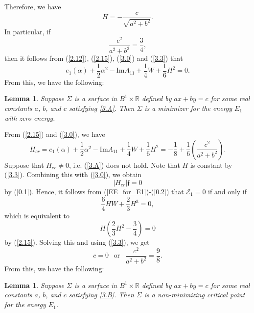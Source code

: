 \documentclass{amsart}
\newtheorem{lem}[theorem]{Lemma}
\theoremstyle{Corollary}
\numberwithin{equation}{section}
\begin{document}
Therefore, we have 
\begin{equation}\label{3.3}
H=-\frac{c}{\sqrt{a^2+b^2}}.
\end{equation}
In particular, if 
\begin{equation}\label{3.A}
\frac{c^2}{a^2+b^2}=\frac{3}{4},
\end{equation}
then it follows from (\ref{2.12}), (\ref{2.15}), (\ref{3.0}) and (\ref{3.3}) that 
$$e_1(\alpha)+\frac{1}{2}\alpha^2-\mbox{Im} A_{11}+\frac{1}{4}W+\frac{1}{6}H^2
=0.$$
From this, we have the following: 
\begin{lem}\label{lem3.1}
Suppose $\Sigma$ is a surface in $B^1\times\mathbb{R}$ 
defined by $ax+by=c$ for some real constants $a$, $b$, and $c$
satisfying \eqref{3.A}. 
Then $\Sigma$ is a minimizer for the energy $E_1$ with zero energy.  
\end{lem}




From (\ref{2.15}) and (\ref{3.0}), we have 
$$H_{cr}=e_1(\alpha)+\frac{1}{2}\alpha^2-\mbox{Im} A_{11}+\frac{1}{4}W+\frac{1}{6}H^2
=-\frac{1}{8}+\frac{1}{6}\left(\frac{c^2}{a^2+b^2}\right).$$
Suppose that $H_{cr}\neq 0$, i.e. 
(\ref{3.A}) does not hold. 
Note that $H$ is constant by (\ref{3.3}). 
Combining this with (\ref{3.0}), we obtain 
$$|H_{cr}|\mathfrak{f}=0$$
by (\ref{0.1}).
Hence, it follows from (\ref{EE_for_E1})-(\ref{0.2}) 
that $\mathcal{E}_1=0$ if and only if 
$$\frac{6}{4}HW+\frac{2}{3}H^3=0,$$
which is equivalent to 
$$H\left(\frac{2}{3}H^2-\frac{3}{4}\right)=0$$
by (\ref{2.15}). Solving this and using (\ref{3.3}), we get
\begin{equation}\label{3.B}
c=0~~\mbox{ or }~~\frac{c^2}{a^2+b^2}=\frac{9}{8}.
\end{equation}
From this, we have the following: 

\begin{lem}\label{lem3.2}
Suppose $\Sigma$ is a surface in $B^1\times\mathbb{R}$ 
defined by $ax+by=c$ for some real constants $a$, $b$, and $c$
satisfying \eqref{3.B}. 
Then $\Sigma$ is a
non-minimizing critical point for the energy $E_1$.  
\end{lem}
\end{document}
